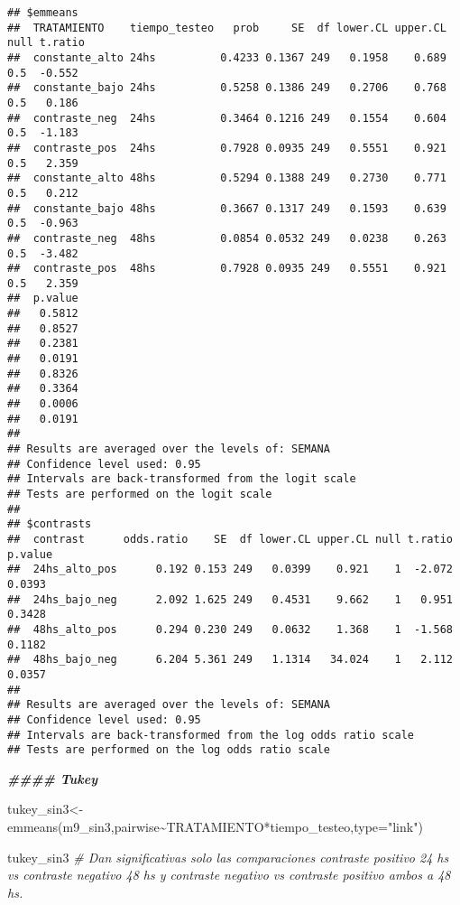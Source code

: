 \documentclass[
]{article}
\newenvironment{Shaded}{\begin{snugshade}}{\end{snugshade}}
\newcommand{\AttributeTok}[1]{\textcolor[rgb]{0.77,0.63,0.00}{#1}}
\newcommand{\CommentTok}[1]{\textcolor[rgb]{0.56,0.35,0.01}{\textit{#1}}}
\newcommand{\DocumentationTok}[1]{\textcolor[rgb]{0.56,0.35,0.01}{\textbf{\textit{#1}}}}
\newcommand{\FunctionTok}[1]{\textcolor[rgb]{0.00,0.00,0.00}{#1}}
\newcommand{\NormalTok}[1]{#1}
\newcommand{\OtherTok}[1]{\textcolor[rgb]{0.56,0.35,0.01}{#1}}
\newcommand{\SpecialCharTok}[1]{\textcolor[rgb]{0.00,0.00,0.00}{#1}}
\newcommand{\StringTok}[1]{\textcolor[rgb]{0.31,0.60,0.02}{#1}}
\begin{document}
\begin{verbatim}
## $emmeans
##  TRATAMIENTO    tiempo_testeo   prob     SE  df lower.CL upper.CL null t.ratio
##  constante_alto 24hs          0.4233 0.1367 249   0.1958    0.689  0.5  -0.552
##  constante_bajo 24hs          0.5258 0.1386 249   0.2706    0.768  0.5   0.186
##  contraste_neg  24hs          0.3464 0.1216 249   0.1554    0.604  0.5  -1.183
##  contraste_pos  24hs          0.7928 0.0935 249   0.5551    0.921  0.5   2.359
##  constante_alto 48hs          0.5294 0.1388 249   0.2730    0.771  0.5   0.212
##  constante_bajo 48hs          0.3667 0.1317 249   0.1593    0.639  0.5  -0.963
##  contraste_neg  48hs          0.0854 0.0532 249   0.0238    0.263  0.5  -3.482
##  contraste_pos  48hs          0.7928 0.0935 249   0.5551    0.921  0.5   2.359
##  p.value
##   0.5812
##   0.8527
##   0.2381
##   0.0191
##   0.8326
##   0.3364
##   0.0006
##   0.0191
## 
## Results are averaged over the levels of: SEMANA 
## Confidence level used: 0.95 
## Intervals are back-transformed from the logit scale 
## Tests are performed on the logit scale 
## 
## $contrasts
##  contrast      odds.ratio    SE  df lower.CL upper.CL null t.ratio p.value
##  24hs_alto_pos      0.192 0.153 249   0.0399    0.921    1  -2.072  0.0393
##  24hs_bajo_neg      2.092 1.625 249   0.4531    9.662    1   0.951  0.3428
##  48hs_alto_pos      0.294 0.230 249   0.0632    1.368    1  -1.568  0.1182
##  48hs_bajo_neg      6.204 5.361 249   1.1314   34.024    1   2.112  0.0357
## 
## Results are averaged over the levels of: SEMANA 
## Confidence level used: 0.95 
## Intervals are back-transformed from the log odds ratio scale 
## Tests are performed on the log odds ratio scale
\end{verbatim}

\begin{Shaded}
\begin{Highlighting}[]
\DocumentationTok{\#\#\#\# Tukey}

\NormalTok{tukey\_sin3}\OtherTok{\textless{}{-}}\FunctionTok{emmeans}\NormalTok{(m9\_sin3,pairwise}\SpecialCharTok{\textasciitilde{}}\NormalTok{TRATAMIENTO}\SpecialCharTok{*}\NormalTok{tiempo\_testeo,}\AttributeTok{type=}\StringTok{"link"}\NormalTok{)}

\NormalTok{tukey\_sin3 }\CommentTok{\# Dan significativas solo las comparaciones contraste positivo 24 hs vs contraste negativo 48 hs y contraste negativo vs contraste positivo ambos a 48 hs.}
\end{Highlighting}
\end{Shaded}
\end{document}
